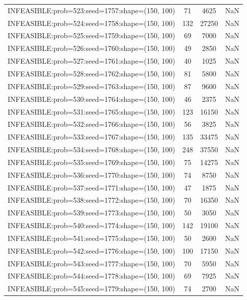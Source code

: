 \begin{longtable}{lccc}
INFEASIBLE:prob=523:seed=1757:shape=(150, 100) &    71 &  4625 &    NaN \\
INFEASIBLE:prob=524:seed=1758:shape=(150, 100) &   132 & 27250 &    NaN \\
INFEASIBLE:prob=525:seed=1759:shape=(150, 100) &    69 &  7000 &    NaN \\
INFEASIBLE:prob=526:seed=1760:shape=(150, 100) &    49 &  2850 &    NaN \\
INFEASIBLE:prob=527:seed=1761:shape=(150, 100) &    40 &  1025 &    NaN \\
INFEASIBLE:prob=528:seed=1762:shape=(150, 100) &    81 &  5800 &    NaN \\
INFEASIBLE:prob=529:seed=1763:shape=(150, 100) &    87 &  9600 &    NaN \\
INFEASIBLE:prob=530:seed=1764:shape=(150, 100) &    46 &  2375 &    NaN \\
INFEASIBLE:prob=531:seed=1765:shape=(150, 100) &   123 & 16150 &    NaN \\
INFEASIBLE:prob=532:seed=1766:shape=(150, 100) &    56 &  3825 &    NaN \\
INFEASIBLE:prob=533:seed=1767:shape=(150, 100) &   135 & 33475 &    NaN \\
INFEASIBLE:prob=534:seed=1768:shape=(150, 100) &   248 & 37550 &    NaN \\
INFEASIBLE:prob=535:seed=1769:shape=(150, 100) &    75 & 14275 &    NaN \\
INFEASIBLE:prob=536:seed=1770:shape=(150, 100) &    74 &  8750 &    NaN \\
INFEASIBLE:prob=537:seed=1771:shape=(150, 100) &    47 &  1875 &    NaN \\
INFEASIBLE:prob=538:seed=1772:shape=(150, 100) &    70 & 16350 &    NaN \\
INFEASIBLE:prob=539:seed=1773:shape=(150, 100) &    50 &  3050 &    NaN \\
INFEASIBLE:prob=540:seed=1774:shape=(150, 100) &   142 & 19100 &    NaN \\
INFEASIBLE:prob=541:seed=1775:shape=(150, 100) &    50 &  2600 &    NaN \\
INFEASIBLE:prob=542:seed=1776:shape=(150, 100) &   100 & 17150 &    NaN \\
INFEASIBLE:prob=543:seed=1777:shape=(150, 100) &    70 &  5950 &    NaN \\
INFEASIBLE:prob=544:seed=1778:shape=(150, 100) &    69 &  7925 &    NaN \\
INFEASIBLE:prob=545:seed=1779:shape=(150, 100) &    74 &  2700 &    NaN \\

\end{longtable}
